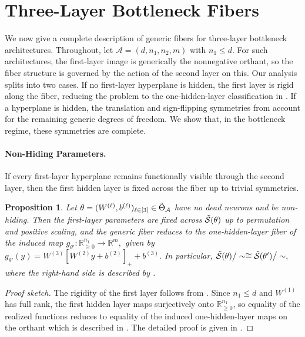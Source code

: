 \documentclass{article}
\newtheorem{prop}[theorem]{Proposition}
\theoremstyle{definition}
\newcommand{\R}{\mathbb{R}}
\newcommand{\architecture}{\mathcal{A}}
\newcommand{\gparamspace}[1]{\Tilde{\Theta}_{#1}}
\newcommand{\weights}[1]{W^{(#1)}}
\newcommand{\bias}[1]{b^{(#1)}}
\newcommand{\gfiber}[1]{\Tilde{\mathcal{S}}({#1})}
\newcommand{\orthant}[1]{\R_{\geq 0}^{#1}}
\newcommand{\modulo}[1]{\big/#1}
\begin{document}
\section{Three-Layer Bottleneck Fibers}
\label{sec:bottleneck}

We now give a complete description of generic fibers for three-layer bottleneck architectures. Throughout, let
$\architecture=(d,n_1,n_2,m)$ with $n_1\le d$.  
%
For such architectures, the first-layer image is generically the nonnegative orthant, so the fiber structure is governed by  
the action of the second layer on this. 
Our analysis splits into two cases. 
If no first-layer hyperplane is hidden, 
the first layer is rigid along the fiber, reducing the problem to the one-hidden-layer classification in . 
If a hyperplane is hidden, the translation and sign-flipping symmetries from  account for the remaining generic degrees of freedom. 
We show that, in the bottleneck regime, these symmetries are complete.


\paragraph{Non-Hiding Parameters.}
If every first-layer hyperplane remains functionally visible through the second layer, then the first hidden layer is fixed across the fiber up to trivial symmetries.

\begin{prop}
\label{prop:3layer_layerwise_reduction_main}
Let $\theta = (\weights{\ell}, \bias{\ell})_{\ell \in [3]} \in \gparamspace{\architecture}$ have no dead neurons and be non-hiding. Then the first-layer parameters are fixed across $\gfiber{\theta}$ up to permutation and positive scaling, and the generic fiber reduces to the one-hidden-layer fiber of the induced map
$
g_{\theta'} \colon \orthant{n_1} \to \R^m,
$ given by $
g_{\theta'}(y)=\weights{3}[\weights{2}y+\bias{2}]_+ + \bias{3}.
$
In particular,
$
\gfiber{\theta}\modulo{\sim}
\cong
\gfiber{\theta'}\modulo{\sim},
$
where the right-hand side is described by .
\end{prop}

\begin{proof}[Proof sketch]
The rigidity of the first layer follows from . Since $n_1\le d$ and $\weights{1}$ has full rank, the first hidden layer maps surjectively onto $\orthant{n_1}$, so equality of the realized functions reduces to equality of the induced one-hidden-layer maps on the orthant which is described in . The detailed proof is given in .
\end{proof}
\end{document}
